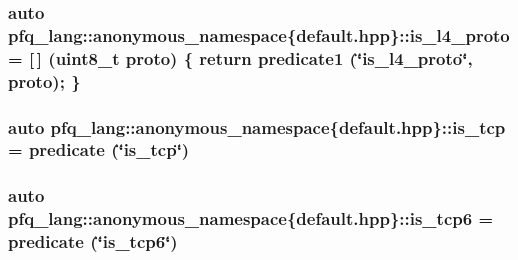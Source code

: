 \hypertarget{namespacepfq__lang_1_1anonymous__namespace_02default_8hpp_03_ac2363f68f819b20eb7afc4acdcdd0bf0}{
\subsubsection[{is\-\_\-l4\-\_\-proto}]{\setlength{\rightskip}{0pt plus 5cm}auto pfq\-\_\-lang\-::anonymous\-\_\-namespace\{default.\-hpp\}\-::is\-\_\-l4\-\_\-proto = \mbox{[}$\,$\mbox{]} (uint8\-\_\-t proto) \{ return {\bf predicate1} (\char`\"{}is\-\_\-l4\-\_\-proto\char`\"{}, proto); \}}}\label{namespacepfq__lang_1_1anonymous__namespace_02default_8hpp_03_ac2363f68f819b20eb7afc4acdcdd0bf0}
\hypertarget{namespacepfq__lang_1_1anonymous__namespace_02default_8hpp_03_a219c50fd572a25336a32e00cf527c565}{
\subsubsection[{is\-\_\-tcp}]{\setlength{\rightskip}{0pt plus 5cm}auto pfq\-\_\-lang\-::anonymous\-\_\-namespace\{default.\-hpp\}\-::is\-\_\-tcp = {\bf predicate} (\char`\"{}is\-\_\-tcp\char`\"{})}}\label{namespacepfq__lang_1_1anonymous__namespace_02default_8hpp_03_a219c50fd572a25336a32e00cf527c565}
\hypertarget{namespacepfq__lang_1_1anonymous__namespace_02default_8hpp_03_a096d3a0faa81e83be5cfeb025526275d}{
\subsubsection[{is\-\_\-tcp6}]{\setlength{\rightskip}{0pt plus 5cm}auto pfq\-\_\-lang\-::anonymous\-\_\-namespace\{default.\-hpp\}\-::is\-\_\-tcp6 = {\bf predicate} (\char`\"{}is\-\_\-tcp6\char`\"{})}}\label{namespacepfq__lang_1_1anonymous__namespace_02default_8hpp_03_a096d3a0faa81e83be5cfeb025526275d}

